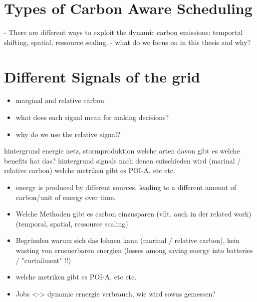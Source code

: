 \section*{Types of Carbon Aware Scheduling}
    - There are different ways to exploit the dynamic carbon emissions: temportal shifting, spatial, ressource scaling.
    - what do we focus on in this thesis and why?


\section*{Different Signals of the grid}

\begin{itemize}
    \item marginal and relative carbon
    \item what does each signal mean for making decisions? 
    \item why do we use the relative signal? 
\end{itemize}

hintergrund energie netz, stormproduktion
welche arten davon gibt es 
welche benefits hat das?
hintergrund signals nach denen entschieden wird (marinal / relative carbon)
welche metriken gibt es POI-A, etc etc.
\begin{itemize}
    \item energy is produced by different sources, leading to a different amount of carbon/unit of energy over time. 
    \item Welche Methoden gibt es carbon einzusparen (vllt. auch in der related work) (temporal, spatial, ressource scaling)
    \item Begründen warum sich das lohnen kann (marinal / relative carbon), kein wasting von erneuerbaren energien (losses among saving energy into batteries / "curtailment" !!)
    \item welche metriken gibt es POI-A, etc etc.
    \item Jobs <-> dynamic ernergie verbrauch, wie wird sowas gemessen?
\end{itemize}